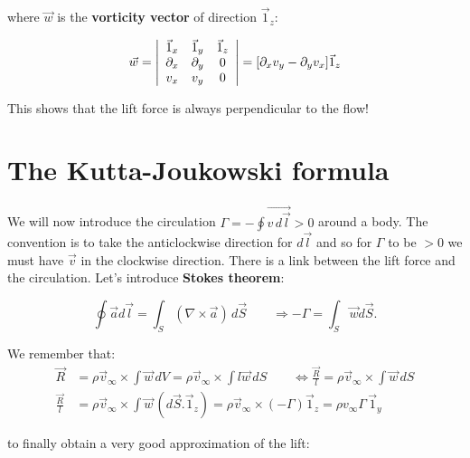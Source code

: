 			where $\vec{w}$ is the \textbf{vorticity vector} of direction $\vec{1}_z$:
			
			\begin{equation}
			\vec{w} = 
			\left| \begin{array}{ccc}
			\vec{1}_x & \vec{1}_y & \vec{1}_z \\ 
			\D _x & \D _y & 0 \\ 
			v_x & v_y & 0
			\end{array} 
			\right| 
			= [\D _x v_y - \D _y v_x] \vec{1}_z
			\end{equation}
			
			This shows that the lift force is always perpendicular to the flow!
		
	\section{The Kutta-Joukowski formula}
		We will now introduce the circulation $\Gamma = - \oint \vec{v \, d\vec{l}} >0$   around a body. The convention is to take the anticlockwise direction for $d\vec{l}$ and so for $\Gamma$ to be $>0$ we must have $\vec{v}$ in the clockwise direction. There is a link between the lift force and the circulation. Let's introduce \textbf{Stokes theorem}:
		
		\begin{equation}
			\oint \vec{a} d\vec{l} = \int _S (\nabla \times \vec{a})\, d\vec{S} \qquad \Rightarrow -\Gamma = \int _S \vec{w} d\vec{S}.
		\end{equation}
		
		We remember that:
		\begin{equation}
		\begin{aligned}
		\vec{R} &= \rho \vec{v}_\infty \times \int  \vec{w}\, dV = \rho \vec{v}_\infty \times \int  l\vec{w}\, dS \qquad \Leftrightarrow \frac{\vec{R}}{l} = \rho \vec{v}_\infty \times \int  \vec{w}\, dS \\
		\frac{\vec{R}}{l}&= \rho \vec{v}_\infty \times \int  \vec{w}\, (d\vec{S}.\vec{1}_z) = \rho \vec{v}_\infty \times (-\Gamma)\vec{1}_z = \rho v_\infty \Gamma \,\vec{1}_y
		\end{aligned}
		\end{equation}
		
		to finally obtain a very good approximation of the lift:
		
		\begin{center}
		\end{center}
		
